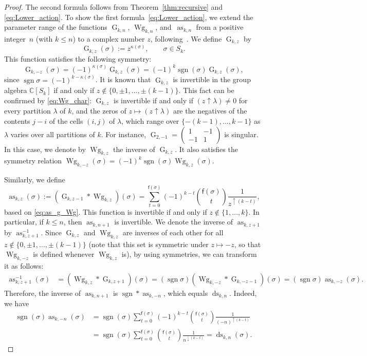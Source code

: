 \documentclass[10pt,a4paper]{amsart}
\numberwithin{equation}{section}
\theoremstyle{definition}
\newcommand{\fix}[1]{\mathsf{f}(#1)}
\DeclareMathOperator{\Raise}{as}
\DeclareMathOperator{\Lower}{ds}
\DeclareMathOperator{\sgn}{sgn}
\DeclareMathOperator{\G}{G}
\DeclareMathOperator{\Wg}{Wg}
\begin{document}
\begin{proof}
The second formula follows from Theorem~\ref{thm:recursive} and \eqref{eq:Lower_action}.
To show the first formula~\eqref{eq:Lower_action}, we extend the parameter range of the functions $\G_{k,n}$, $\Wg_{k,n}$, and~$\Raise_{k,n}$
from a positive integer~$n$ (with $k \le n$) to a complex number $z$, following~\cite{CollinsSniady2006}.
We define $\G_{k,z}$ by
\[
\G_{k,z} (\sigma) := z^{\kappa(\sigma)}, \qquad \sigma \in S_k.
\]
This function satisfies the following symmetry:
\[
\G_{k,-z}(\sigma)= (-1)^{\kappa(\sigma)} \G_{k,z}(\sigma)
=(-1)^k \sgn (\sigma) \G_{k,z}(\sigma),
\]
since $\sgn \sigma=(-1)^{k-\kappa(\sigma)}$.
It is known that $\G_{k,z}$ is invertible in the group algebra $\mathbb{C}[S_k]$ if and only if $z \not\in \{0, \pm 1, \dots, \pm(k-1)\}$.
This fact can be confirmed by \eqref{eq:Wg_char}: $\G_{k,z}$ is invertible if and only if $(z \uparrow \lambda) \neq 0$ for every partition $\lambda$ of $k$, and the zeros of $z \mapsto (z \uparrow \lambda)$ are the negatives of the contents $j-i$ of the cells $(i,j)$ of $\lambda$, which range over $\{-(k-1),\dots,k-1\}$ as $\lambda$ varies over all partitions of $k$. For instance, $\G_{2,-1}=\left(\begin{smallmatrix} 1 & -1 \\ -1 & 1\end{smallmatrix}\right)$ is singular.
In this case, we denote by $\Wg_{k,z}$ the inverse of $\G_{k,z}$.
It also satisfies the symmetry relation
$\Wg_{k,-z}(\sigma)=(-1)^k \sgn (\sigma) \Wg_{k,z}(\sigma)$.

Similarly, we define
\[
\Raise_{k,z}(\sigma) := (\G_{k,z-1} * \Wg_{k,z})(\sigma) =
\sum_{t=0}^{\fix{\sigma}} (-1)^{k-t} \binom{\fix{\sigma}}{t} \frac{1}{z^{\uparrow (k-t)}},
\]
based on \eqref{eq:as_g_Wg}.
This function is invertible if and only if $z \not\in \{1, \dots, k\}$.
In particular, if $k \le n$, then $\Raise_{k,n+1}$ is invertible.
We denote the inverse of $\Raise_{k,z+1}$ by $\Raise^{-1}_{k,z+1}$.
Since $\G_{k,z}$ and $\Wg_{k,z}$ are inverses of each other for all $z \not\in \{0, \pm 1, \dots, \pm(k-1)\}$ (note that this set is symmetric under $z \mapsto -z$, so that $\Wg_{k,-z}$ is defined whenever $\Wg_{k,z}$ is),
by using symmetries, we can transform it as follows:
\begin{align*}
\Raise^{-1}_{k,z+1} (\sigma)&= (\Wg_{k,z} * \G_{k,z+1}) (\sigma)
 = (\sgn \sigma) (\Wg_{k,-z} * \G_{k,-z-1})(\sigma) = (\sgn \sigma) \Raise_{k,-z}(\sigma).
\end{align*}
Therefore, the inverse of $\Raise_{k,n+1}$ is $\sgn * \Raise_{k,-n}$,
which equals $\Lower_{k,n}$. Indeed, we have
\begin{align*}
\sgn(\sigma) \Raise_{k,-n}(\sigma)
&=\sgn (\sigma)
\sum_{t=0}^{\fix{\sigma}} (-1)^{k-t} \binom{\fix{\sigma}}{t} \frac{1}{(-n)^{\uparrow (k-t)}} \\
&= \sgn (\sigma)
\sum_{t=0}^{\fix{\sigma}} \binom{\fix{\sigma}}{t} \frac{1}{n^{\downarrow (k-t)}} = \Lower_{k,n}(\sigma).\tag*{\qed}
\end{align*}\renewcommand{\qed}{}
\end{proof}
\end{document}
